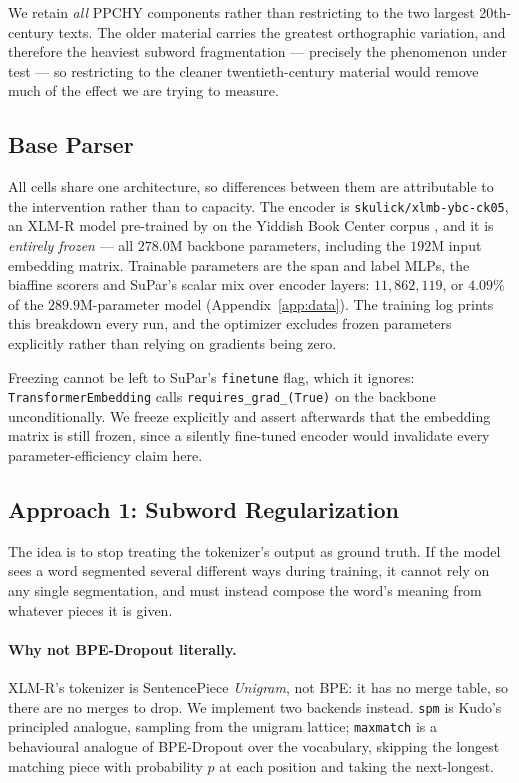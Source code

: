 \documentclass[11pt]{article}
\begin{document}
We retain \emph{all} PPCHY components rather than restricting to the two largest
20th-century texts. The older material carries the greatest orthographic
variation, and therefore the heaviest subword fragmentation --- precisely the
phenomenon under test --- so restricting to the cleaner twentieth-century
material would remove much of the effect we are trying to measure.


\subsection{Base Parser}

All cells share one architecture, so differences between them are attributable
to the intervention rather than to capacity. The encoder is
\texttt{skulick/xlmb-ybc-ck05}, an XLM-R model pre-trained by
\citet{kulick-etal-2022-part} on the Yiddish Book Center corpus
\citep{ybc-2023}, and it is \emph{entirely frozen} --- all $278.0$M backbone
parameters, including the $192$M input embedding matrix. Trainable parameters are
the span and label MLPs, the biaffine scorers and SuPar's scalar mix over encoder
layers: $11{,}862{,}119$, or $4.09\%$ of the $289.9$M-parameter model
(Appendix~\ref{app:data}). The training log prints this breakdown every run, and
the optimizer excludes frozen parameters explicitly rather than relying on
gradients being zero.


Freezing cannot be left to SuPar's \texttt{finetune} flag, which it ignores:
\texttt{TransformerEmbedding} calls \texttt{requires\_grad\_(True)} on the
backbone unconditionally. We freeze explicitly and assert afterwards that the
embedding matrix is still frozen, since a silently fine-tuned encoder would
invalidate every parameter-efficiency claim here.

\subsection{Approach 1: Subword Regularization}
\label{sec:subword}

The idea is to stop treating the tokenizer's output as ground truth. If the model
sees a word segmented several different ways during training, it cannot rely on
any single segmentation, and must instead compose the word's meaning from
whatever pieces it is given.

\paragraph{Why not BPE-Dropout literally.} XLM-R's tokenizer is SentencePiece
\emph{Unigram}, not BPE: it has no merge table, so there are no merges to drop.
We implement two backends instead. \texttt{spm} is Kudo's principled analogue,
sampling from the unigram lattice; \texttt{maxmatch} is a behavioural analogue of
BPE-Dropout over the vocabulary, skipping the longest matching piece with
probability $p$ at each position and taking the next-longest.
\end{document}
